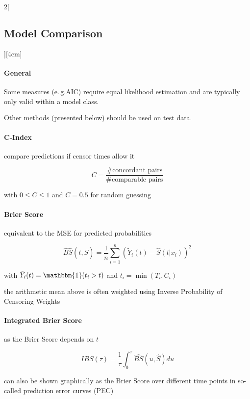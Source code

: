 \documentclass[8pt]{extarticle}
\begin{document}
\begin{multicols}{2}[\subsection{Model Comparison}][4cm] 

\paragraph{General} Some measures (e.\,g.\@ AIC) require equal likelihood estimation and are typically only valid within a model class. 

\noindent Other methods (presented below) should be used on test data.

\paragraph{C-Index} compare predictions if censor times allow it

$$C=\frac{\text{\#concordant pairs}}{\text{\#comparable pairs}}$$

with $0\leq C\leq 1$ and $C=0.5$ for random guessing

\paragraph{Brier Score} equivalent to the MSE for predicted probabilities

$$\widehat{BS}(t,\hat{S})=\frac{1}{n}\sum_{i=1}^n(\tilde{Y}_i(t)- \hat{S}(t|x_i))^2$$

with $\tilde{Y}_i(t)= \mathbbm{1}(t_i > t)$ and $t_i =\min (T_i, C_i)$

\noindent the arithmetic mean above is often weighted using Inverse Probability of Censoring Weights

\paragraph{Integrated Brier Score} as the Brier Score depends on $t$

$$IBS(\tau)=\frac{1}{\tau}\int_0^\tau \widehat{BS}(u,\hat{S}) du$$

\noindent can also be shown graphically as the Brier Score over different time points in so-called prediction error curves (PEC)


\end{multicols}

\end{document}
